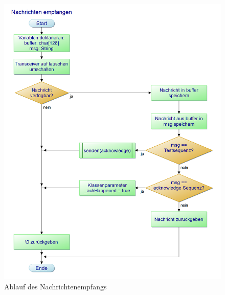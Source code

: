 \documentclass[a4paper, 11pt]{scrartcl}
\begin{document}
\begin{small}
\begin{figure}[H]
    \begin{center}
        \includegraphics[scale=0.35]{Bilder/Nachrichten_empfangen.png}
        \caption{Ablauf des Nachrichtenempfangs}\label{diag:receive_pap}
    \end{center}
\end{figure}


\end{small}
\end{document}
